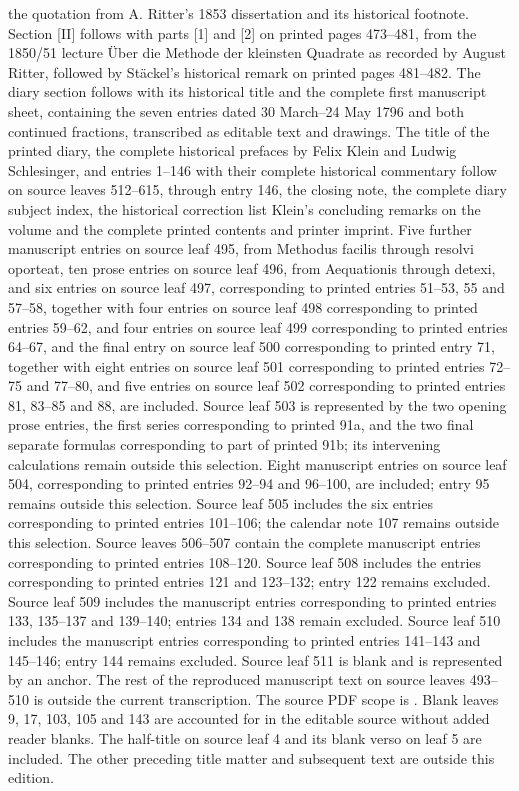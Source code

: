 the quotation from A. Ritter’s 1853 dissertation and its historical footnote. Section [II] follows with parts [1] and [2] on printed pages 473–481, from the 1850/51 lecture Über die Methode der kleinsten Quadrate as recorded by August Ritter, followed by Stäckel’s historical remark on printed pages 481–482. The diary section follows with its historical title and the complete first manuscript sheet, containing the seven entries dated 30 March–24 May 1796 and both continued fractions, transcribed as editable text and drawings. The title of the printed diary, the complete historical prefaces by Felix Klein and Ludwig Schlesinger, and entries 1–146 with their complete historical commentary follow on source leaves 512–615, through entry 146, the closing note, the complete diary subject index, the historical correction list Klein’s concluding remarks on the volume and the complete printed contents and printer imprint. Five further manuscript entries on source leaf 495, from Methodus facilis through resolvi oporteat, ten prose entries on source leaf 496, from Aequationis through detexi, and six entries on source leaf 497, corresponding to printed entries 51–53, 55 and 57–58, together with four entries on source leaf 498 corresponding to printed entries 59–62, and four entries on source leaf 499 corresponding to printed entries 64–67, and the final entry on source leaf 500 corresponding to printed entry 71, together with eight entries on source leaf 501 corresponding to printed entries 72–75 and 77–80, and five entries on source leaf 502 corresponding to printed entries 81, 83–85 and 88, are included. Source leaf 503 is represented by the two opening prose entries, the first series corresponding to printed 91a, and the two final separate formulas corresponding to part of printed 91b; its intervening calculations remain outside this selection. Eight manuscript entries on source leaf 504, corresponding to printed entries 92–94 and 96–100, are included; entry 95 remains outside this selection. Source leaf 505 includes the six entries corresponding to printed entries 101–106; the calendar note 107 remains outside this selection. Source leaves 506–507 contain the complete manuscript entries corresponding to printed entries 108–120. Source leaf 508 includes the entries corresponding to printed entries 121 and 123–132; entry 122 remains excluded. Source leaf 509 includes the manuscript entries corresponding to printed entries 133, 135–137 and 139–140; entries 134 and 138 remain excluded. Source leaf 510 includes the manuscript entries corresponding to printed entries 141–143 and 145–146; entry 144 remains excluded. Source leaf 511 is blank and is represented by an anchor. The rest of the reproduced manuscript text on source leaves 493–510 is outside the current transcription. The source PDF scope is \GaussXOneEditionScope. Blank leaves 9, 17, 103, 105 and 143 are accounted for in the editable source without added reader blanks. The half-title on source leaf 4 and its blank verso on leaf 5 are included. The other preceding title matter and subsequent text are outside this edition.

